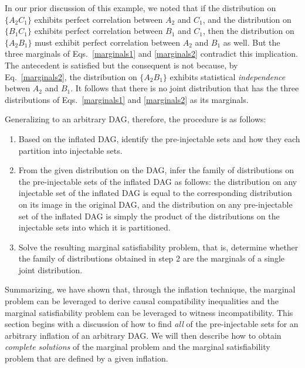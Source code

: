 {In our prior discussion of this example, we noted that if the distribution on $\{ A_2 C_1\}$ exhibits perfect correlation between $A_2$ and $C_1$, and the distribution on $\{ B_1 C_1\}$ exhibits perfect correlation between $B_1$ and $C_1$, then the distribution on $\{ A_2 B_1\}$ must exhibit perfect correlation between $A_2$ and $B_1$ as well.  
But the three marginals of Eqs.~\eqref{marginals1} and \eqref{marginals2} contradict this implication.  The antecedent is satisfied but the consequent is not because, by Eq.~\eqref{marginals2}, the distribution on $\{ A_2 B_1\}$ exhibits statistical {\em independence} betwen $A_2$ and $B_1$.  It follows that there is no joint distribution that has the three distributions of Eqs.~\eqref{marginals1} and \eqref{marginals2} as its marginals. 

Generalizing to an arbitrary DAG, therefore, the procedure is as follows:
\begin{enumerate}
\item Based on the inflated DAG, identify the pre-injectable sets and how they each partition into injectable sets.
\item From the given distribution on the DAG, infer the family of distributions on the pre-injectable sets of the inflated DAG as follows: the distribution on any injectable set of the inflated DAG is equal to the corresponding distribution on its image in the original DAG, and the distribution on any pre-injectable set of the inflated DAG is simply the product of the distributions on the injectable sets into which it is partitioned.
\item Solve the resulting marginal satisfiability problem, that is, determine whether the family of distributions obtained in step 2 are the marginals of a single joint distribution.
\end{enumerate}



Summarizing, we have shown that, through the inflation technique, the marginal problem can be leveraged to derive causal compatibility inequalities and the marginal satisfiability problem can be leveraged to witness incompatibility.  This section begins with a discussion of how to find {\em all} of the pre-injectable sets for an arbitrary inflation of an arbitrary DAG.  We will then describe how to obtain {\em complete solutions} of the marginal problem and the marginal satisfiability problem that are defined by a given inflation. 


}
